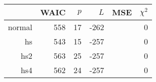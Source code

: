 \begin{tabular}{rrrrrr}
  \hline
 & WAIC & $p$ & $L$ & MSE & $\chi^2$ \\ 
  \hline
normal & 558 & 17 & -262 &  & 0 \\ 
  hs & 543 & 15 & -257 &  & 0 \\ 
  hs2 & 563 & 25 & -257 &  & 0 \\ 
  hs4 & 562 & 24 & -257 &  & 0 \\ 
   \hline
\end{tabular}
